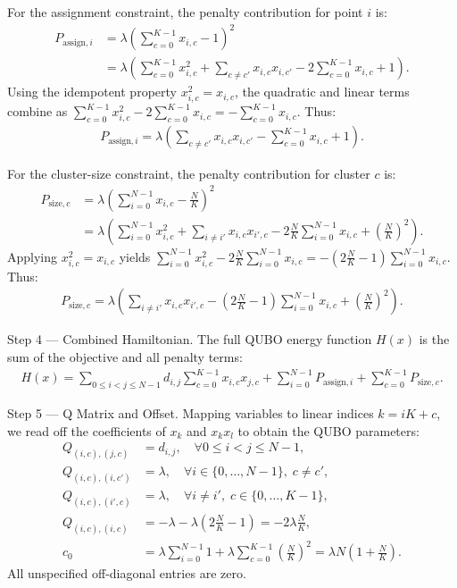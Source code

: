 \documentclass[12pt]{article}
\begin{document}
For the assignment constraint, the penalty contribution for point $i$ is:
\begin{align}
P_{\text{assign},i} &= \lambda \left( \sum_{c=0}^{K-1} x_{i,c} - 1 \right)^2 \\
&= \lambda \left( \sum_{c=0}^{K-1} x_{i,c}^2 + \sum_{c \neq c'} x_{i,c} x_{i,c'} - 2 \sum_{c=0}^{K-1} x_{i,c} + 1 \right).
\end{align}
Using the idempotent property $x_{i,c}^2 = x_{i,c}$, the quadratic and linear terms combine as $\sum_{c=0}^{K-1} x_{i,c}^2 - 2 \sum_{c=0}^{K-1} x_{i,c} = -\sum_{c=0}^{K-1} x_{i,c}$. Thus:
\begin{align}
P_{\text{assign},i} = \lambda \left( \sum_{c \neq c'} x_{i,c} x_{i,c'} - \sum_{c=0}^{K-1} x_{i,c} + 1 \right).
\end{align}

For the cluster-size constraint, the penalty contribution for cluster $c$ is:
\begin{align}
P_{\text{size},c} &= \lambda \left( \sum_{i=0}^{N-1} x_{i,c} - \frac{N}{K} \right)^2 \\
&= \lambda \left( \sum_{i=0}^{N-1} x_{i,c}^2 + \sum_{i \neq i'} x_{i,c} x_{i',c} - 2\frac{N}{K} \sum_{i=0}^{N-1} x_{i,c} + \left(\frac{N}{K}\right)^2 \right).
\end{align}
Applying $x_{i,c}^2 = x_{i,c}$ yields $\sum_{i=0}^{N-1} x_{i,c}^2 - 2\frac{N}{K} \sum_{i=0}^{N-1} x_{i,c} = -\left(2\frac{N}{K} - 1\right) \sum_{i=0}^{N-1} x_{i,c}$. Thus:
\begin{align}
P_{\text{size},c} = \lambda \left( \sum_{i \neq i'} x_{i,c} x_{i',c} - \left(2\frac{N}{K} - 1\right) \sum_{i=0}^{N-1} x_{i,c} + \left(\frac{N}{K}\right)^2 \right).
\end{align}

Step 4 --- Combined Hamiltonian. The full QUBO energy function $H(x)$ is the sum of the objective and all penalty terms:
\begin{align}
H(x) = \sum_{0 \le i < j \le N-1} d_{i,j} \sum_{c=0}^{K-1} x_{i,c} x_{j,c} + \sum_{i=0}^{N-1} P_{\text{assign},i} + \sum_{c=0}^{K-1} P_{\text{size},c}.
\end{align}

Step 5 --- Q Matrix and Offset. Mapping variables to linear indices $k = iK + c$, we read off the coefficients of $x_k$ and $x_k x_l$ to obtain the QUBO parameters:
\begin{align}
Q_{(i,c),(j,c)} &= d_{i,j}, \quad \forall 0 \le i < j \le N-1, \\
Q_{(i,c),(i,c')} &= \lambda, \quad \forall i \in \{0,\dots,N-1\}, \; c \neq c', \\
Q_{(i,c),(i',c)} &= \lambda, \quad \forall i \neq i', \; c \in \{0,\dots,K-1\}, \\
Q_{(i,c),(i,c)} &= -\lambda - \lambda\left(2\frac{N}{K} - 1\right) = -2\lambda \frac{N}{K}, \\
c_0 &= \lambda \sum_{i=0}^{N-1} 1 + \lambda \sum_{c=0}^{K-1} \left(\frac{N}{K}\right)^2 = \lambda N \left(1 + \frac{N}{K}\right).
\end{align}
All unspecified off-diagonal entries are zero.
\end{document}

